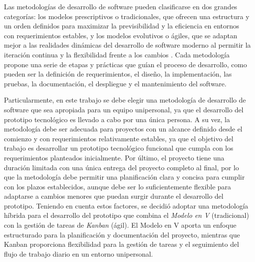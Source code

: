 Las metodologías de desarrollo de software pueden clasificarse en dos grandes categorías: los modelos prescriptivos o tradicionales, que ofrecen una estructura y un orden definidos para maximizar la previsibilidad y la eficiencia en entornos con requerimientos estables, y los modelos evolutivos o ágiles, que se adaptan mejor a las realidades dinámicas del desarrollo de software moderno al permitir la iteración continua y la flexibilidad frente a los cambios \cite{pressman2010ingenieria}. Cada metodología propone una serie de etapas y prácticas que guían el proceso de desarrollo, como pueden ser la definición de requerimientos, el diseño, la implementación, las pruebas, la documentación, el despliegue y el mantenimiento del software.

Particularmente, en este trabajo se debe elegir una metodología de desarrollo de software que sea apropiada para un equipo unipersonal, ya que el desarrollo del prototipo tecnológico es llevado a cabo por una única persona. A su vez, la metodología debe ser adecuada para proyectos con un alcance definido desde el comienzo y con requerimientos relativamente estables, ya que el objetivo del trabajo es desarrollar un prototipo tecnológico funcional que cumpla con los requerimientos planteados inicialmente. Por último, el proyecto tiene una duración limitada con una única entrega del proyecto completo al final, por lo que la metodología debe permitir una planificación clara y concisa para cumplir con los plazos establecidos, aunque debe ser lo suficientemente flexible para adaptarse a cambios menores que puedan surgir durante el desarrollo del prototipo. Teniendo en cuenta estos factores, se decidió adoptar una metodología híbrida para el desarrollo del prototipo que combina el \textit{Modelo en V} (tradicional) con la gestión de tareas de \textit{Kanban} (ágil). El Modelo en V aporta un enfoque estructurado para la planificación y documentación del proyecto, mientras que Kanban proporciona flexibilidad para la gestión de tareas y el seguimiento del flujo de trabajo diario en un entorno unipersonal.

